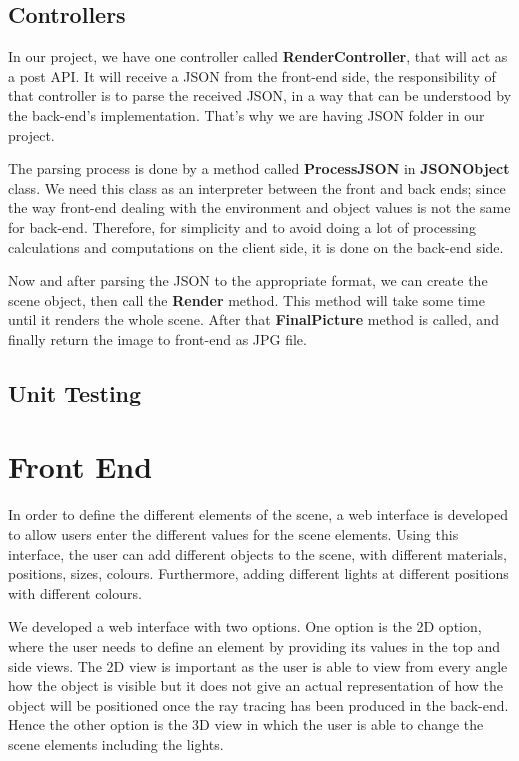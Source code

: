 \documentclass[a4paper]{report}
\begin{document}
	\subsection{Controllers}
	In our project, we have one controller called \textbf{RenderController}, that will act as a post API. It will receive a JSON from the front-end side, the responsibility of that controller is to parse the received JSON, in a way that can be understood by the back-end's implementation. That's why we are having JSON folder in our project.\\
	\par The parsing process is done by a method called \textbf{ProcessJSON} in \textbf{JSONObject} class. We need this class as an interpreter between the front and back ends; since the way front-end dealing with the environment and object values is not the same for back-end. Therefore, for simplicity and to avoid doing a lot of processing calculations and computations on the client side, it is done on the back-end side.
	\par Now and after parsing the JSON to the appropriate format, we can create the scene object, then call the \textbf{Render} method. This method will take some time until it renders the whole scene. After that \textbf{FinalPicture} method is called, and finally return the image to front-end as JPG file.
	\subsection{Unit Testing}
	\section{Front End}
	
	In order to define the different elements of the scene, a web interface is developed to allow users enter the different values for the scene elements. Using this interface, the user can add different objects to the scene, with different materials, positions, sizes, colours. Furthermore, adding different lights at different positions with different colours.
	\par We developed a web interface with two options. One option is the 2D option, where the user needs to define an element by providing its values in the top and side views. The 2D view is important as the user is able to view from every angle how the object is visible but it does not give an actual representation of how the object will be positioned once the ray tracing has been produced in the back-end. Hence the other option is the 3D view in which the user is able to change the scene elements including the lights. 
	
\end{document}
